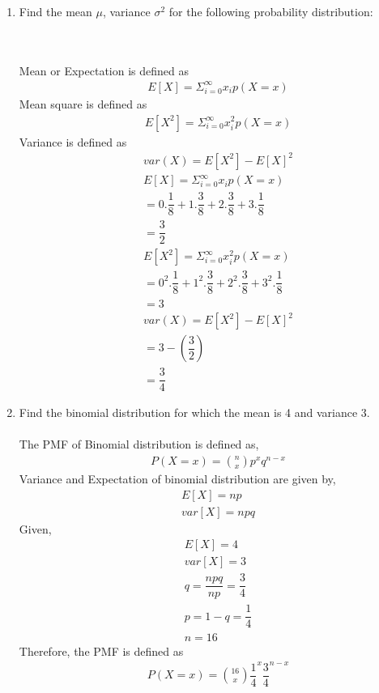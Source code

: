 \documentclass[journal,12pt,twocolumn]{IEEEtran}
\renewcommand\thesection{\arabic{section}}
\begin{document}
\begin{enumerate}[label=\thesection.\arabic*.,ref=\thesection.\theenumi]
\item Find the mean $\mu$, variance $\sigma^2$ for the following probability distribution:
\begin{table}[htb]
 \tiny
 \caption{}
 \end{table}\\
 \solution\\
 Mean or Expectation is defined as
 \begin{align}
 & E[X] = \Sigma_{i=0}^ \infty x_i p(X=x)
 \end{align}
 Mean square is defined as
 \begin{align}
 & E[X^2] = \Sigma_{i=0}^ \infty x_i^2 p(X=x)
 \end{align}
 Variance is defined as
 \begin{align}
 &var(X) =  E[X^2] -E[X]^2  
 \end{align}
 \begin{align}
 &E[X] = \Sigma_{i=0}^ \infty x_i p(X=x) \\
 & = 0.\dfrac{1}{8} +1.\dfrac{3}{8} +2.\dfrac{3}{8}+3.\dfrac{1}{8} \\
 & = \dfrac{3}{2}\\
 &E[X^2] = \Sigma_{i=0}^ \infty x_i^2 p(X=x) \\
 & = 0^2.\dfrac{1}{8} +1^2.\dfrac{3}{8} +2^2.\dfrac{3}{8}+3^2.\dfrac{1}{8} \\
 & = 3\\
 &var(X) =  E[X^2] -E[X]^2\\
 & = 3 - \left(\dfrac{3}{2}\right) \\
 & = \dfrac{3}{4}
 \end{align}
 \item Find the binomial distribution for which the mean is 4 and variance 3.\\
 \solution\\
 The PMF of Binomial distribution is defined as,
 \begin{align}
 & P(X=x) = \binom{n}{x}p^xq^{n-x}
 \end{align}
 Variance and Expectation of binomial distribution are given by,
 \begin{align}
 &E[X] =np\\
& var[X] = npq
 \end{align}
 Given,
 \begin{align}
 &E[X] =4\\
 &var[X] =3\\
 & q = \dfrac{npq}{np} = \dfrac{3}{4}\\
 & p =1-q = \dfrac{1}{4}\\
 &n = 16
 \end{align} 
 Therefore, the PMF is defined as
  \begin{align}
 & P(X=x) = \binom{16}{x}\dfrac{1}{4}^x\dfrac{3}{4}^{n-x}
 \end{align}
 \end{enumerate}
\end{document}

